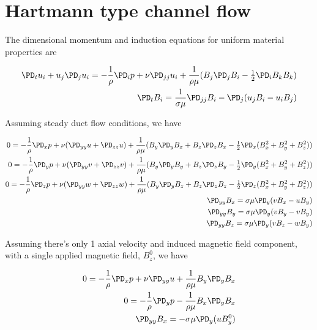 \documentclass[11pt]{article}
\begin{document}
\doublespacing
\MOONSTITLE
\maketitle

\section{Hartmann type channel flow}

The dimensional momentum and induction equations for uniform material properties are

\begin{equation}\begin{aligned}
\PD_t u_i+u_j\PD_j u_i = -\frac{1}{\rho} \PD_i p+ \nu \PD_{jj} u_i + \frac{1}{\rho \mu} (B_j \PD_j B_i - \tfrac{1}{2} \PD_i B_k B_k) \\
\PD_t B_i = \frac{1}{\sigma \mu} \PD_{jj} B_i - \PD_j (u_j B_i - u_i B_j)
\end{aligned} \end{equation}

Assuming steady duct flow conditions, we have

\begin{equation}\begin{aligned}
0 = -\frac{1}{\rho} \PD_x p + \nu (\PD_{yy} u + \PD_{zz} u) + \frac{1}{\rho \mu} (B_y \PD_y B_x + B_z \PD_z B_x - \tfrac{1}{2} \PD_x (B_x^2+B_y^2+B_z^2)) \\
0 = -\frac{1}{\rho} \PD_y p + \nu (\PD_{yy} v + \PD_{zz} v) + \frac{1}{\rho \mu} (B_y \PD_y B_y + B_z \PD_z B_y - \tfrac{1}{2} \PD_y (B_x^2+B_y^2+B_z^2)) \\
0 = -\frac{1}{\rho} \PD_z p + \nu (\PD_{yy} w + \PD_{zz} w) + \frac{1}{\rho \mu} (B_y \PD_y B_z + B_z \PD_z B_z - \tfrac{1}{2} \PD_z (B_x^2+B_y^2+B_z^2)) \\
\PD_{yy} B_x = \sigma \mu \PD_y (v B_x - u B_y) \\
\PD_{yy} B_y = \sigma \mu \PD_y (v B_y - v B_y) \\
\PD_{yy} B_z = \sigma \mu \PD_y (v B_z - w B_y) \\
\end{aligned} \end{equation}

Assuming there's only 1 axial velocity and induced magnetic field component, with a single applied magnetic field, $B_z^0$, we have

\begin{equation}\begin{aligned}
0 = -\frac{1}{\rho} \PD_x p + \nu \PD_{yy} u + \frac{1}{\rho \mu} B_y \PD_y B_x  \\
0 = -\frac{1}{\rho} \PD_y p - \frac{1}{\rho \mu} B_x \PD_y B_x \\
\PD_{yy} B_x = - \sigma \mu \PD_y (u B_y^0) \\
\end{aligned} \end{equation}
\end{document}
